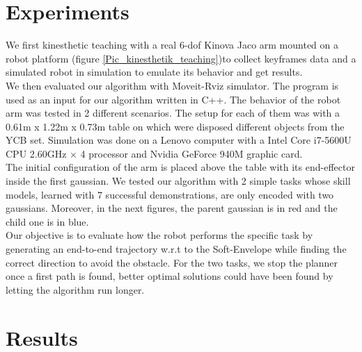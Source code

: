 \documentclass[letterpaper, 10 pt, conference]{ieeeconf}  %
\begin{document}
\section{Experiments}
We first kinesthetic teaching with a real 6-dof Kinova Jaco arm mounted on a robot platform (figure \ref{Pic_kinesthetik_teaching})to collect keyframes data and a simulated robot in simulation to emulate its behavior and get results.\\
We then evaluated our algorithm with Moveit-Rviz simulator. The program is used as an input for our algorithm written in C++. The behavior of the robot arm was tested in 2 different scenarios. The setup for each of them was with a 0.61m x 1.22m x 0.73m table on which were disposed different objects from the YCB set. Simulation was done on a Lenovo computer with  a Intel Core i7-5600U CPU 2.60GHz × 4 processor and Nvidia GeForce 940M graphic card.\\
 The initial configuration of the arm is placed above the table with its end-effector inside the first gaussian. We tested our algorithm with 2 simple tasks whose skill models, learned with 7 successful demonstrations, are only encoded with two gaussians.  Moreover, in the next figures, the parent gaussian is in red and the child one is in blue.\\
  Our objective is to evaluate how the robot performs the specific task by generating an end-to-end trajectory w.r.t to the Soft-Envelope while finding the correct direction to avoid the obstacle. For the two tasks, we stop the planner once a first path is found, better optimal solutions could have been found by letting the algorithm run longer.

\section{Results}
\end{document}
